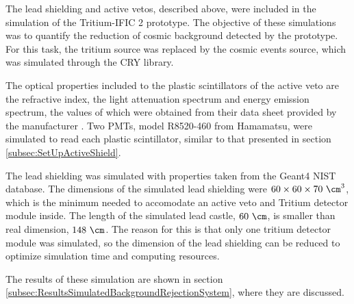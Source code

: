 The lead shielding and active vetos, described above, were included in the simulation of the Tritium-IFIC 2 prototype. The objective of these simulations was to quantify the reduction of cosmic background detected by the prototype. For this task, the tritium source was replaced by the cosmic events source, which was simulated through the CRY library.


The optical properties included to the plastic scintillators of the active veto are the refractive index, the light attenuation spectrum and energy emission spectrum, the values of which were obtained from their data sheet provided by the manufacturer \cite{ScintillatorVeto}. Two PMTs, model R8520-460 from Hamamatsu, were simulated to read each plastic scintillator, similar to that presented in section \ref{subsec:SetUpActiveShield}.

The lead shielding was simulated with properties taken from the Geant4 NIST database. The dimensions of the simulated lead shielding were $60 \times 60 \times 70~\cm^3$, which is the minimum needed to accomodate an active veto and Tritium detector module inside. The length of the simulated lead castle, $60~\cm$, is smaller than real dimension, $148~\cm$. The reason for this is that only one tritium detector module was simulated, so the dimension of the lead shielding can be reduced to optimize simulation time and computing resources.

The results of these simulation are shown in section \ref{subsec:ResultsSimulatedBackgroundRejectionSystem}, where they are discussed.